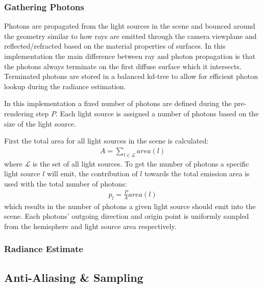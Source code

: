 \documentclass[a4paper, twocolumn]{article}
\begin{document}
            \subsubsection{Gathering Photons} \label{sec:gathering_photons}

            Photons are propagated from the light sources in the scene and bounced around the geometry similar to how rays are emitted through the camera viewplane and reflected/refracted based on the material properties of surfaces. In this implementation the main difference between ray and photon propagation is that the photons always terminate on the first diffuse surface which it intersects. Terminated photons are stored in a balanced kd-tree to allow for efficient photon lookup during the radiance estimation. 

            In this implementation a fixed number of photons are defined during the pre-rendering step \(P\). Each light source is assigned a number of photons based on the size of the light source.

            First the total area for all light sources in the scene is calculated: 
            \begin{align*}
            A = \sum_{l \in \mathcal{L}}{area(l)}
            \end{align*}
            where \(\mathcal{L}\) is the set of all light sources. To get the number of photons a specific light source \(l\) will emit, the contribution of \(l\) towards the total emission area is used with the total number of photons:
            \begin{align*}
            p_l = \frac{P}{A}area(l)
            \end{align*}
            which results in the number of photons a given light source should emit into the scene. Each photons' outgoing direction and origin point is uniformly sampled from the hemisphere and light source area respectively. 

            \subsubsection{Radiance Estimate} \label{sec:radiance_estimate}

        \clearpage

        \subsection{Anti-Aliasing \& Sampling} \label{sec:anti-aliasing_and_sampling}
\end{document}
